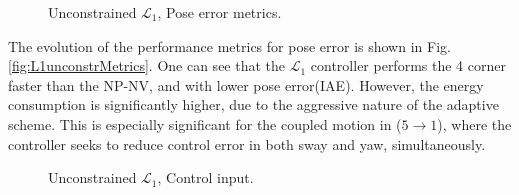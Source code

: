 \begin{figure}[!h]
    \centering
    \caption{Unconstrained $\mathcal{L}_1$, Pose error metrics. }
\end{figure}\label{fig:L1unconstrMetrics}

The evolution of the performance metrics for pose error is shown in Fig. \ref{fig:L1unconstrMetrics}. One can see that the $\mathcal{L}_1$ controller performs the 4 corner faster than the NP-NV, and with lower pose error(IAE). However, the energy consumption is significantly higher, due to the aggressive nature of the adaptive scheme. This is especially significant for the coupled motion in ($5 \xrightarrow{} 1$), where the controller seeks to reduce control error in both sway and yaw, simultaneously.

\begin{figure}[!h]
    \centering
    \caption{Unconstrained $\mathcal{L}_1$, Control input. }
\end{figure}\label{fig:L1unconstTau}


